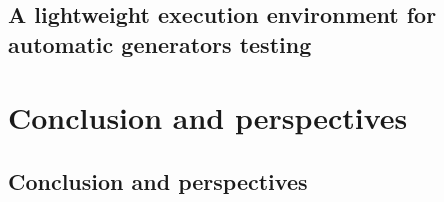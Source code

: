 \documentclass[letterpaper,12pt,titlepage, english, openright]{book}
\let\origdoublepage\cleardoublepage
\newcommand{\clearemptydoublepage}{%
  \clearpage{\pagestyle{empty}\origdoublepage}}
\let\cleardoublepage\clearemptydoublepage
\begin{document}
\chapter{A lightweight execution environment for automatic generators testing }\label{chap:docker}

\part{Conclusion and perspectives}
\chapter[Conclusion and perspectives]{Conclusion and perspectives}\label{chap:conclusion}














\cleardoublepage %
\renewcommand*{\bibname}{References}





\nocite{*}

\newpage
\cleardoublepage
{} \label{listoffigs}
\listoffigures

\newpage
{} \label{listoftabs}
\listoftables
\end{document}
